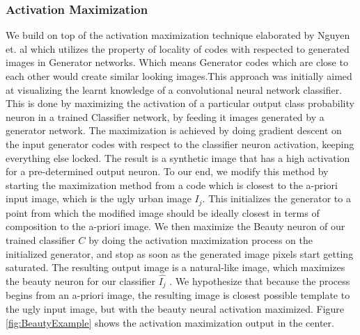 \subsubsection{Activation Maximization}
We build on top of the activation maximization technique elaborated by Nguyen et. al \cite{nguyen2016synthesizing} which utilizes the property of locality of codes with respected to generated images in Generator networks. Which means Generator codes which are close to each other would create similar looking images.This approach was initially aimed at visualizing the learnt knowledge of a convolutional neural network classifier. This is done by maximizing the activation of a particular output class probability neuron in a trained Classifier network, by feeding it images generated by a generator network. The maximization is achieved by doing gradient descent on the input generator codes with respect to the classifier neuron activation, keeping everything else locked. The result is a synthetic image that has a high activation for a pre-determined output neuron.
To our end, we modify this method by starting the maximization method from a code which is closest to the a-priori input image, which is the ugly urban image $I_j$. This initializes the generator to a point from which the modified image should be ideally closest in terms of composition to the a-priori image. We then maximize the Beauty neuron of our trained classifier $C$ by doing the activation maximization process on the initialized generator, and stop as soon as the generated image pixels start getting saturated. The resulting output image is a natural-like image, which maximizes the beauty neuron for our classifier $\hat{I_j}$ . We hypothesize that because the process begins from an a-priori image, the resulting image is closest possible template to the ugly input image, but with the beauty neural activation maximized. Figure \ref{fig:BeautyExample} shows the activation maximization output in the center.


